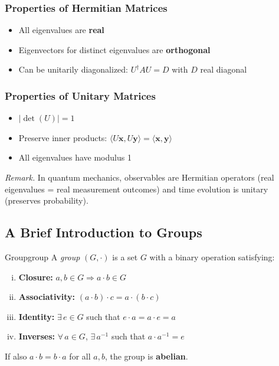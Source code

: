 \documentclass[11pt, letterpaper]{article}
\theoremstyle{plain}
\newenvironment{remark}{\smallskip\noindent\textit{Remark.}}{\smallskip}
\newcommand{\vv}[1]{\bm{#1}}
\begin{document}
\subsubsection*{Properties of Hermitian Matrices}
\begin{itemize}
    \item All eigenvalues are \textbf{real}
    \item Eigenvectors for distinct eigenvalues are \textbf{orthogonal}
    \item Can be unitarily diagonalized: $U^\dagger A U = D$
          with $D$ real diagonal
\end{itemize}

\subsubsection*{Properties of Unitary Matrices}
\begin{itemize}
    \item $|\det(U)| = 1$
    \item Preserve inner products: $\langle U\vv{x}, U\vv{y}\rangle = \langle\vv{x},\vv{y}\rangle$
    \item All eigenvalues have modulus 1
\end{itemize}

\begin{remark}
    In quantum mechanics, observables are Hermitian operators (real eigenvalues
    = real measurement outcomes) and time evolution is unitary (preserves
    probability).
\end{remark}


\subsection{A Brief Introduction to Groups}

\begin{definition}{Group}{group}
    A \emph{group} $(G, \cdot)$ is a set $G$ with a binary operation
    satisfying:
    \begin{enumerate}[(i)]
        \item \textbf{Closure:} $a,b\in G \Rightarrow a\cdot b\in G$
        \item \textbf{Associativity:} $(a\cdot b)\cdot c = a\cdot(b\cdot c)$
        \item \textbf{Identity:} $\exists\, e\in G$ such that $e\cdot a = a\cdot e = a$
        \item \textbf{Inverses:} $\forall\, a\in G$, $\exists\, a^{-1}$ such that
              $a\cdot a^{-1} = e$
    \end{enumerate}
    If also $a\cdot b = b\cdot a$ for all $a,b$, the group is \textbf{abelian}.
\end{definition}
\end{document}
